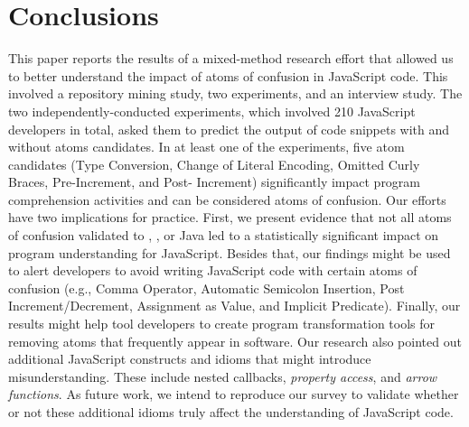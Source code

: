 \section{Conclusions}
\label{conclusion}

This paper reports the results of a mixed-method research effort that allowed us to better understand the impact of atoms of confusion in JavaScript code. This involved a repository mining study, two experiments, and an interview study. The two independently-conducted experiments, which involved 210 JavaScript developers in total, asked them to predict the output of code snippets with and without atoms candidates. In at least one of the experiments, five atom candidates (Type Conversion, Change of Literal Encoding, Omitted Curly Braces, Pre-Increment, and Post- Increment) significantly impact program comprehension activities and can be considered atoms of confusion.
Our efforts have two implications for practice. First, we present evidence that not all atoms of confusion validated to \clang, \cpplang, or Java led to a statistically significant impact on program understanding for JavaScript. Besides that, our findings might be used to alert developers to avoid writing JavaScript code with certain atoms of confusion (e.g., Comma Operator, Automatic Semicolon Insertion, Post Increment/Decrement, Assignment as Value, and Implicit Predicate). Finally, our results might help tool developers to create program transformation tools for removing atoms that frequently appear in software. 
Our research also pointed out additional JavaScript constructs and idioms 
that might introduce misunderstanding. These include nested callbacks, %
\emph{property access}, and \emph{arrow functions}. As future work, we intend to
reproduce our survey to validate whether or not these additional
idioms 
truly affect
the understanding of JavaScript code. 

